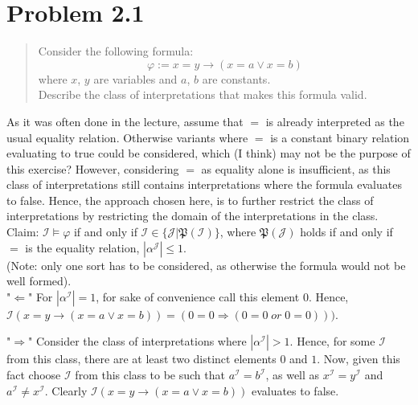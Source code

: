\documentclass[11pt,a4paper]{article}
\newcommand{\sor}{ \; or \;}
\newcommand{\sto}{\Rightarrow}
\begin{document}
\section*{Problem 2.1}
\begin{quote}
Consider the following formula:
\begin{equation*}
\varphi := x=y \to (x = a \lor x = b)
\end{equation*}
where $x$, $y$ are variables and $a$, $b$ are constants. \\
Describe the class of interpretations that makes this formula valid.
\end{quote}
As it was often done in the lecture, assume that $=$ is already interpreted as the usual equality relation. Otherwise variants where $=$ is a constant binary relation evaluating to true could be considered, which (I think) may not be the purpose of this exercise? However, considering $=$ as equality  alone is insufficient, as this class of interpretations still contains interpretations where the formula evaluates to false. Hence, the approach chosen here, is to further restrict the class of interpretations by restricting the domain of the interpretations in the class.  \\

Claim: $\mathcal{I} \models \varphi$ if and only if $\mathcal{I} \in \{ \mathcal{J} | \mathfrak{P}(\mathcal{I})\}$, where $\mathfrak{P}(\mathcal{J})$ holds if and only if $=$ is the equality relation, $|\alpha^{\mathcal{J}}|\leq 1$. \\

(Note: only one sort has to be considered, as otherwise the formula would not be well formed). \\

"$\Leftarrow$" For $|\alpha^{\mathcal{I}}|=1$, for sake of convenience call this element $0$. Hence, $\mathcal{I}(x=y \to (x = a \lor x = b)) = (0= 0 \sto (0 = 0 \sor 0 = 0)))$. 

"$\Rightarrow$" Consider the class of interpretations where $|\alpha^{\mathcal{I}}|>1$. Hence, for some $\mathcal{I}$ from this class, there are at least two distinct elements $0$ and $1$. Now, given this fact choose $\mathcal{I}$ from this class to be such that $a^{\mathcal{I}}=b^{\mathcal{I}}$, as well as $x^{\mathcal{I}}=y^{\mathcal{I}}$ and $a^{\mathcal{I}}\neq x^{\mathcal{I}}$. Clearly $\mathcal{I}(x=y \to (x = a \lor x = b))$ evaluates to false.\\
\end{document}
